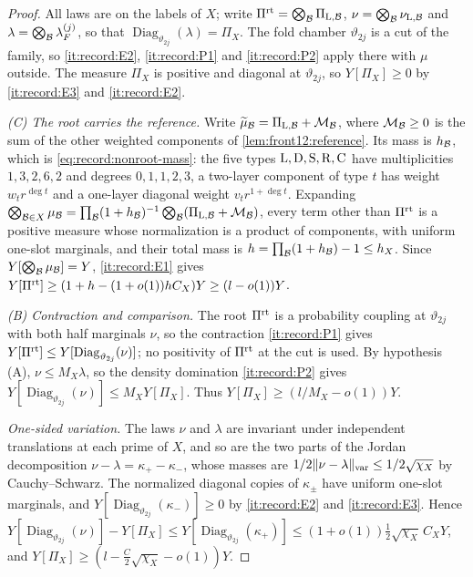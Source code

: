 \begin{proof}
All laws are on the labels of $X$; write $\Pi^{\rm rt}=\bigotimes_\Blk
\Pi_{\mathrm L,\Blk}$, $\nu=\bigotimes_\Blk\nu_{\mathrm L,\Blk}$ and
$\lambda=\bigotimes_\Blk\lambda_F^{(j)}$, so that
$\operatorname{Diag}_{\vartheta_{2j}}(\lambda)=\Pi_X$. The fold chamber
$\vartheta_{2j}$ is a cut of the family, so \ref{it:record:E2},
\ref{it:record:P1} and \ref{it:record:P2} apply there with $\mu$ outside. The
measure $\Pi_X$ is positive and diagonal at $\vartheta_{2j}$, so $Y[\Pi_X]\ge0$
by \ref{it:record:E3} and \ref{it:record:E2}.

\emph{(C) The root carries the reference.} Write $\widetilde\mu_\Blk=
\Pi_{\mathrm L,\Blk}+\mathcal M_\Blk$, where $\mathcal M_\Blk\ge0$ is the sum of
the other weighted components of \cref{lem:front12:reference}. Its mass is
$h_\Blk$, which is \eqref{eq:record:nonroot-mass}: the five types
$\rm L,D,S,R,C$ have multiplicities $1,3,2,6,2$ and degrees $0,1,1,2,3$, a
two-layer component of type $t$ has weight $w_tr^{\deg t}$ and a one-layer
diagonal weight $v_tr^{1+\deg t}$. Expanding $\bigotimes_{\Blk\in X}\mu_\Blk=
\prod_\Blk(1+h_\Blk)^{-1}\bigotimes_\Blk(\Pi_{\mathrm L,\Blk}+\mathcal M_\Blk)$,
every term other than $\Pi^{\rm rt}$ is a positive measure whose normalization
is a product of components, with uniform one-slot marginals, and their total
mass is $h=\prod_\Blk(1+h_\Blk)-1\le h_X$. Since $Y[\bigotimes_\Blk\mu_\Blk]=Y$,
\ref{it:record:E1} gives $Y[\Pi^{\rm rt}]\ge(1+h-(1+o(1))hC_X)Y\ge(l-o(1))Y$.

\emph{(B) Contraction and comparison.} The root $\Pi^{\rm rt}$ is a probability
coupling at $\vartheta_{2j}$ with both half marginals $\nu$, so the contraction
\ref{it:record:P1} gives $Y[\Pi^{\rm rt}]\le
Y[\operatorname{Diag}_{\vartheta_{2j}}(\nu)]$; no positivity of $\Pi^{\rm rt}$ at
the cut is used. By hypothesis (A), $\nu\le M_X\lambda$, so the density
domination \ref{it:record:P2} gives $Y[\operatorname{Diag}_{\vartheta_{2j}}(\nu)]\le
M_XY[\Pi_X]$. Thus $Y[\Pi_X]\ge(l/M_X-o(1))Y$.

\emph{One-sided variation.} The laws $\nu$ and $\lambda$ are invariant under
independent translations at each prime of $X$, and so are the two parts of the
Jordan decomposition $\nu-\lambda=\kappa_+-\kappa_-$, whose masses are
$\frac12\|\nu-\lambda\|_{\rm var}\le\frac12\sqrt{\chi_X}$ by Cauchy--Schwarz. The
normalized diagonal copies of $\kappa_\pm$ have uniform one-slot marginals, and
$Y[\operatorname{Diag}_{\vartheta_{2j}}(\kappa_-)]\ge0$ by \ref{it:record:E2} and
\ref{it:record:E3}. Hence
$Y[\operatorname{Diag}_{\vartheta_{2j}}(\nu)]-Y[\Pi_X]\le
Y[\operatorname{Diag}_{\vartheta_{2j}}(\kappa_+)]\le(1+o(1))\frac12\sqrt{\chi_X}\,C_XY$,
and $Y[\Pi_X]\ge(l-\frac C2\sqrt{\chi_X}-o(1))Y$.


\end{proof}
